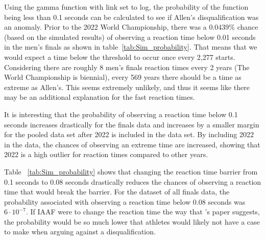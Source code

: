 \documentclass[12pt, letterpaper, titlepage]{article}
\begin{document}
Using the gamma function with link set to log, the probability of the function being
less than 0.1 seconds can be calculated to see if Allen's disqualification was an anomaly.
Prior to the 2022 World Championship, there was a 0.0439\% chance (based on the
simulated results) of observing a reaction time below 0.01 seconds in the men's
finals as shown in table~\ref{tab:Sim_probability}.
That means that we would expect a time below the threshold to occur
once every 2,277 starts.  Considering there are roughly 8 men's finals reaction
times every 2 years (The World Championship is biennial), every 569 years there
should be a time as extreme as Allen's.  This seems extremely unlikely, and thus
it seems like there may be an additional explanation for the fast reaction times.


It is interesting that the probability of observing a reaction time below 0.1
seconds increases drastically for the finals data and increases by a smaller margin
for the pooled data set after 2022 is included in the data set.  By including 2022
in the data, the chances of observing an extreme time are increased, showing that
2022 is a high outlier for reaction times compared to other years.


Table ~\ref{tab:Sim_probability} shows that changing the reaction time barrier from 0.1 seconds to
0.08 seconds drastically reduces the chances of observing a reaction time that
would break the barrier.  For the dataset of all finals data, the probability
associated with observing a reaction time below 0.08 seconds was $6\cdot10^{-7}$.
If IAAF were to change the reaction time the way that \citet{komi2009iaaf}'s paper
suggests, the probability would be so much lower that athletes would likely not
have a case to make when arguing against a disqualification.

\end{document}

